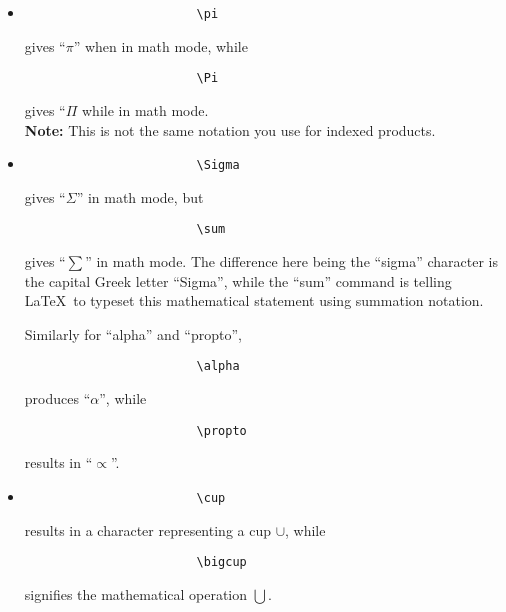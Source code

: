 \documentclass[11pt,letterpaper,twoside,titlepage]{article}
\newcommand{\latex}{\LaTeX \ }
\begin{document}
			\begin{itemize}
			
				\item 
				
					\begin{verbatim}
						\pi
					\end{verbatim}
					
					gives ``$\pi$'' when in math mode, while
					
					\begin{verbatim}
						\Pi
					\end{verbatim}
					
					gives ``$\Pi$ while in math mode. \\
					
					\textbf{Note:} This is not the same notation you use for indexed products.
				
				\item 
				
					\begin{verbatim}
						\Sigma
					\end{verbatim}
					
					gives ``$\Sigma$'' in math mode, but
					
					\begin{verbatim}
						\sum
					\end{verbatim}
					
					gives ``$\sum$'' in math mode.  The difference here being the ``sigma'' character is the capital Greek letter ``Sigma'', while the ``sum'' command is telling \latex to typeset this mathematical statement using summation notation.
					
					Similarly for ``alpha'' and ``propto'',

					\begin{verbatim}
						\alpha
					\end{verbatim}
					
					produces ``$\alpha$'', while 
					
					\begin{verbatim}
						\propto
					\end{verbatim}
					
					results in ``$\propto$''.
					
				\item
				
					\begin{verbatim}
						\cup
					\end{verbatim}
					
					results in a character representing a cup $\cup$, while
					
					\begin{verbatim}
						\bigcup
					\end{verbatim}
					
					signifies the mathematical operation $\bigcup$.
			
			\end{itemize}
			
\end{document}
